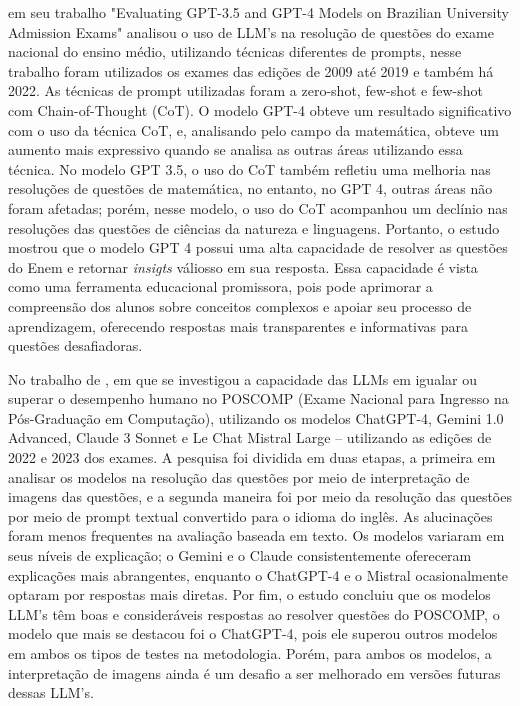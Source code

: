 \textcite{nunes2023evaluating} em seu trabalho "Evaluating GPT-3.5 and GPT-4 Models on Brazilian University Admission Exams" analisou o uso de LLM's na resolução de questões do exame nacional do ensino médio, utilizando técnicas diferentes de prompts, nesse trabalho foram utilizados os exames das edições de 2009 até 2019 e também há 2022. As técnicas de prompt utilizadas foram a zero-shot, few-shot e few-shot com Chain-of-Thought (CoT). O modelo GPT-4 obteve um resultado significativo com o uso da técnica CoT, e, analisando pelo campo da matemática, obteve um aumento mais expressivo quando se analisa as outras áreas utilizando essa técnica. No modelo GPT 3.5, o uso do CoT também refletiu uma melhoria nas resoluções de questões de matemática, no entanto, no GPT 4, outras áreas não foram afetadas; porém, nesse modelo, o uso do CoT acompanhou um declínio nas resoluções das questões de ciências da natureza e linguagens. Portanto, o estudo mostrou que o modelo GPT 4 possui uma alta capacidade de resolver as questões do Enem e retornar \textit{insigts} váliosso em sua resposta. Essa capacidade é vista como uma ferramenta educacional promissora, pois pode aprimorar a compreensão dos alunos sobre conceitos complexos e apoiar seu processo de aprendizagem, oferecendo respostas mais transparentes e informativas para questões desafiadoras.

No trabalho de \textcite{viegas2024avaliando}, em que se investigou a capacidade das LLMs em igualar ou superar o desempenho humano no POSCOMP (Exame Nacional para Ingresso na Pós-Graduação em Computação), utilizando os modelos ChatGPT-4, Gemini 1.0 Advanced, Claude 3 Sonnet e Le Chat Mistral Large – utilizando as edições de 2022 e 2023 dos exames. A pesquisa foi dividida em duas etapas, a primeira em analisar os modelos na resolução das questões por meio de interpretação de imagens das questões, e a segunda maneira foi por meio da resolução das questões por meio de prompt textual convertido para o idioma do inglês. As alucinações foram menos frequentes na avaliação baseada em texto. Os modelos variaram em seus níveis de explicação; o Gemini e o Claude consistentemente ofereceram explicações mais abrangentes, enquanto o ChatGPT-4 e o Mistral ocasionalmente optaram por respostas mais diretas. Por fim, o estudo concluiu que os modelos LLM's têm boas e consideráveis respostas ao resolver questões do POSCOMP, o modelo que mais se destacou foi o ChatGPT-4, pois ele superou outros modelos em ambos os tipos de testes na metodologia. Porém, para ambos os modelos, a interpretação de imagens ainda é um desafio a ser melhorado em versões futuras dessas LLM's.

